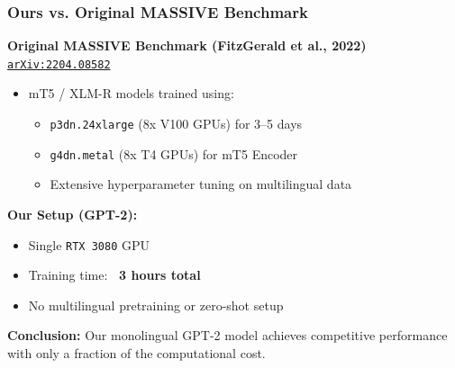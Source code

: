 \documentclass{beamer}
\begin{document}
\begin{frame}
  \frametitle{Ours vs. Original MASSIVE Benchmark}
  
  \textbf{Original MASSIVE Benchmark (FitzGerald et al., 2022)} \\[0.5em]
  \href{https://arxiv.org/pdf/2204.08582}{\texttt{arXiv:2204.08582}}
  
  \vspace{0.5em}
  \begin{itemize}
    \item mT5 / XLM-R models trained using:
    \begin{itemize}
      \item \texttt{p3dn.24xlarge} (8x V100 GPUs) for 3–5 days
      \item \texttt{g4dn.metal} (8x T4 GPUs) for mT5 Encoder
      \item Extensive hyperparameter tuning on multilingual data
    \end{itemize}
  \end{itemize}
  
  \vspace{1em}
  \textbf{Our Setup (GPT-2):}
  \begin{itemize}
    \item Single \texttt{RTX 3080} GPU
    \item Training time: \textbf{~3 hours total}
    \item No multilingual pretraining or zero-shot setup
  \end{itemize}
  
  \vspace{1em}
  \textbf{Conclusion:} Our monolingual GPT-2 model achieves competitive performance with only a fraction of the computational cost.
\end{frame}
\end{document}
